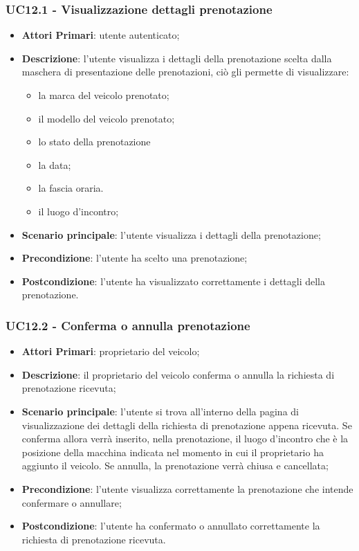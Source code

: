  \subsubsection{UC12.1 - Visualizzazione dettagli prenotazione}
\begin{itemize}
	\item \textbf{Attori Primari}: utente autenticato;
	\item \textbf{Descrizione}: l'utente visualizza i dettagli della prenotazione scelta dalla maschera di presentazione delle prenotazioni, ciò gli permette di visualizzare:
	\begin{itemize}
		\item la marca del veicolo prenotato;
		\item il modello del veicolo prenotato;
		\item lo stato della prenotazione
		\item la data;
		\item la fascia oraria.	
		\item il luogo d'incontro;
	\end{itemize}
	\item \textbf{Scenario principale}: l'utente visualizza i dettagli della prenotazione;	
	\item \textbf{Precondizione}: l'utente ha scelto una prenotazione;
	\item \textbf{Postcondizione}: l'utente ha visualizzato correttamente i dettagli della prenotazione.
\end{itemize}
\subsubsection{UC12.2 - Conferma o annulla prenotazione}
\begin{itemize}
	\item \textbf{Attori Primari}: proprietario del veicolo;
	\item \textbf{Descrizione}: il proprietario del veicolo conferma o annulla la richiesta di prenotazione ricevuta;
	\item \textbf{Scenario principale}: l'utente si trova all'interno della pagina di visualizzazione dei dettagli della richiesta di prenotazione appena ricevuta. Se conferma allora verrà inserito, nella prenotazione, il luogo d'incontro che è la posizione della macchina indicata nel momento in cui il proprietario ha aggiunto il veicolo.\newline
	Se annulla, la prenotazione verrà chiusa e cancellata;
	\item \textbf{Precondizione}: l'utente visualizza correttamente la prenotazione che intende confermare o annullare;
	\item \textbf{Postcondizione}: l'utente ha confermato o annullato correttamente la richiesta di prenotazione ricevuta.
\end{itemize}
